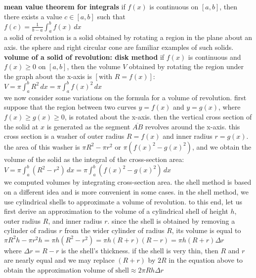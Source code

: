 \documentclass{article}
\begin{document}
\textbf{mean value theorem for integrals} if $f(x)$ is continuous on $[a, b]$, then there exists a value $c \in [a, b]$ such that\\ $f(c) = \frac{1}{b - a}\int_{a}^{b}f(x)\,dx$\\

a solid of revolution is a solid obtained by rotating a region in the plane about an axis. the sphere and right circular cone are familiar examples of such solids.\\

\textbf{volume of a solid of revolution: disk method} if $f(x)$ is continuous and $f(x) \geq 0$ on $[a, b]$, then the volume $V$ obtained by rotating the region under the graph about the x-axis is $[\text{with } R = f(x)]$:\\ $V = \pi\int_{a}^{b}R^2\,dx = \pi\int_{a}^{b}f(x)^2\,dx$\\

we now consider some variations on the formula for a volume of revolution. first suppose that the region between two curves $y = f(x)$ and $y = g(x)$, where $f(x) \geq g(x) \geq 0$, is rotated about the x-axis. then the vertical cross section of the solid at $x$ is generated as the segment $\overline{AB}$ revolves around the x-axis. this cross section is a washer of outer radius $R = f(x)$ and inner radius $r = g(x)$. the area of this washer is $\pi R^2 - \pi r^2$ or $\pi(f(x)^2 - g(x)^2)$, and we obtain the volume of the solid as the integral of the cross-section area:\\ $V = \pi \int_{a}^{b}(R^2 - r^2)\,dx = \pi \int_{a}^{b}(f(x)^2 - g(x)^2)\,dx$\\

we computed volumes by integrating cross-section area. the shell method is based on a different idea and is more convenient in some cases. in the shell method, we use cylindrical shells to approximate a volume of revolution. to this end, let us first derive an approximation to the volume of a cylindrical shell of height $h$, outer radius $R$, and inner radius $r$. since the shell is obtained by removing a cylinder of radius $r$ from the wider cylinder of radius $R$, its volume is equal to\\ $\pi R^2h - \pi r^2h = \pi h(R^2 - r^2) = \pi h(R + r)(R - r) = \pi h(R + r)\Delta r$\\ where $\Delta r = R - r$ is the shell's thickness. if the shell is very thin, then $R$ and $r$ are nearly equal and we may replace $(R + r)$ by $2R$ in the equation above to obtain the approximation $\text{volume of shell} \approx 2\pi Rh\Delta r$\\
\end{document}
